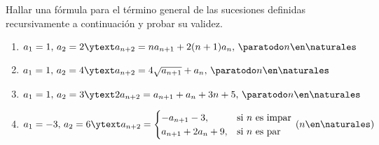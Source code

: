 \begin{enunciado}{\ejercicio}
  Hallar una fórmula para el término general de las sucesiones definidas recursivamente a continuación
  y probar su validez.
  \begin{enumerate}[label=\roman*)]
    \item $a_1 = 1,\, a_2 = 2  \ytext a_{n+2} = n a_{n+1} + 2(n+1)a_n,\, \paratodo n \en \naturales $
    \item $a_1 = 1,\, a_2 = 4  \ytext a_{n+2} = 4 \sqrt{a_{n+1}} + a_n,\, \paratodo n \en \naturales $
    \item $a_1 = 1,\, a_2 = 3  \ytext 2 a_{n+2} = a_{n+1} + a_n + 3n + 5,\, \paratodo n \en \naturales $
    \item $a_1 = -3,\, a_2 = 6  \ytext 
            a_{n+2} =
            \begin{cases}
              -a_{n+1} - 3,        & \text{si $n$ es impar} \\
              a_{n+1} + 2 a_n + 9, & \text{si $n$ es par}
            \end{cases}
            \,  (n \en \naturales )$
  \end{enumerate}
\end{enunciado}

